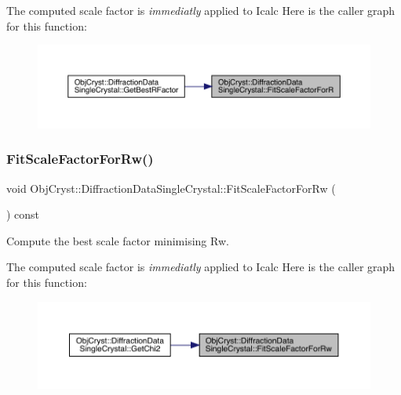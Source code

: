The computed scale factor is {\itshape immediatly} applied to Icalc Here is the caller graph for this function\+:
\nopagebreak
\begin{figure}[H]
\begin{center}
\leavevmode
\includegraphics[width=350pt]{class_obj_cryst_1_1_diffraction_data_single_crystal_a64a07606d4f21cc2d6389161bebc8645_icgraph}
\end{center}
\end{figure}
\mbox{\label{class_obj_cryst_1_1_diffraction_data_single_crystal_a435fc2d77a7ec7c948214eacb8ce8f3b}} 
\subsubsection{\texorpdfstring{FitScaleFactorForRw()}{FitScaleFactorForRw()}}
{\footnotesize\ttfamily void Obj\+Cryst\+::\+Diffraction\+Data\+Single\+Crystal\+::\+Fit\+Scale\+Factor\+For\+Rw (\begin{DoxyParamCaption}{ }\end{DoxyParamCaption}) const\hspace{0.3cm}{\ttfamily [virtual]}}

Compute the best scale factor minimising Rw.

The computed scale factor is {\itshape immediatly} applied to Icalc Here is the caller graph for this function\+:
\nopagebreak
\begin{figure}[H]
\begin{center}
\leavevmode
\includegraphics[width=350pt]{class_obj_cryst_1_1_diffraction_data_single_crystal_a435fc2d77a7ec7c948214eacb8ce8f3b_icgraph}
\end{center}
\end{figure}
\mbox{\label{class_obj_cryst_1_1_diffraction_data_single_crystal_a48bf1e9a133db940e2de70a446765914}} 
